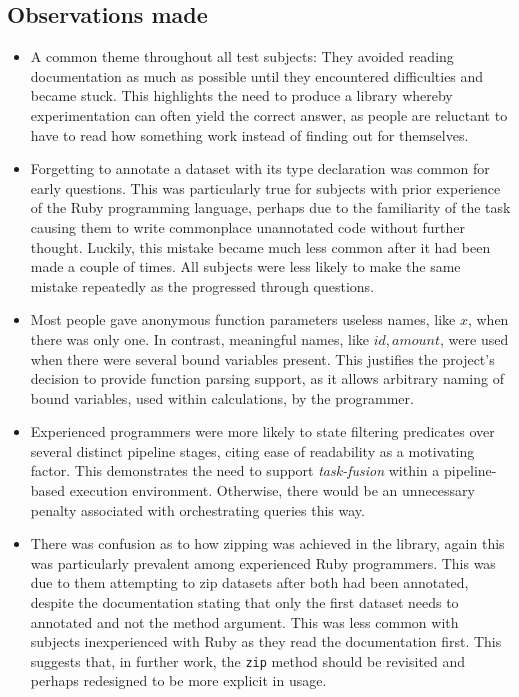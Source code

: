 \subsection{Observations made}
\begin{itemize}
  \item A common theme throughout all test subjects: They avoided reading documentation as much as possible until they encountered difficulties and became stuck.
  This highlights the need to produce a library whereby experimentation can often yield the correct answer, as people are reluctant to have to read how something work instead of finding out for themselves.

  \item Forgetting to annotate a dataset with its type declaration was common for early questions. This was particularly true for subjects with prior experience of the Ruby programming language, perhaps due to the familiarity of the task causing them to write commonplace unannotated code without further thought. Luckily, this mistake became much less common after it had been made a couple of times. All subjects were less likely to make the same mistake repeatedly as the progressed through questions.

  \item Most people gave anonymous function parameters useless names, like $x$, when there was only one. In contrast, meaningful names, like $id, amount$, were used when there were several bound variables present.
    This justifies the project's decision to provide function parsing support, as it allows arbitrary naming of bound variables, used within calculations, by the programmer.

  \item Experienced programmers were more likely to state filtering predicates over several distinct pipeline stages, citing ease of readability as a motivating factor. This demonstrates the need to support \emph{task-fusion} within a pipeline-based execution environment. Otherwise, there would be an unnecessary penalty associated with orchestrating queries this way.

  \item There was confusion as to how zipping was achieved in the library, again this was particularly prevalent among experienced Ruby programmers. This was due to them attempting to zip datasets after both had been annotated, despite the documentation stating that only the first dataset needs to annotated and not the method argument. This was less common with subjects inexperienced with Ruby as they read the documentation first. This suggests that, in further work, the \verb|zip| method should be revisited and perhaps redesigned to be more explicit in usage.


\end{itemize}
